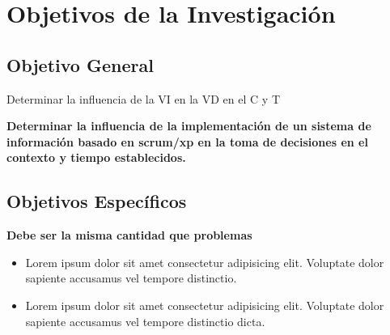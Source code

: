 \chapter{Objetivos de la Investigación}
\section{Objetivo General}
    \begin{sectext}
            Determinar la influencia de la VI en la VD en el C y T

            \textbf{Determinar la influencia de la implementación de un sistema de información basado en scrum/xp en la toma de decisiones en el contexto y tiempo establecidos.}
    \end{sectext}

\section{Objetivos Específicos}
    \begin{sectext}
        \textbf{Debe ser la misma cantidad que problemas}
            \begin{itemize}
                \item Lorem ipsum dolor sit amet consectetur adipisicing elit. Voluptate dolor sapiente accusamus vel tempore distinctio.

                \item Lorem ipsum dolor sit amet consectetur adipisicing elit. Voluptate dolor sapiente accusamus vel tempore distinctio dicta.
            \end{itemize}
    \end{sectext}